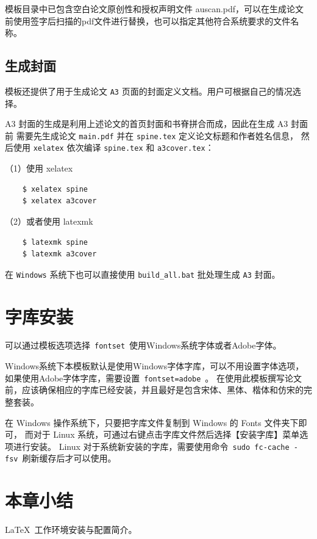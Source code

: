 模板目录中已包含空白论文原创性和授权声明文件 auscan.pdf，可以在生成论文前使用签字后扫描的pdf文件进行替换，也可以指定其他符合系统要求的文件名称。

\subsection{生成封面}
\label{sec:generate-cover}

模板还提供了用于生成论文 \texttt{A3} 页面的封面定义文档。用户可根据自己的情况选择。

A3 封面的生成是利用上述论文的首页封面和书脊拼合而成，因此在生成 A3 封面前
需要先生成论文 \texttt{main.pdf} 并在 \texttt{spine.tex} 定义论文标题和作者姓名信息，
然后使用 \texttt{xelatex} 依次编译 \texttt{spine.tex} 和 \texttt{a3cover.tex}：

（1）使用 xelatex

\begin{lstlisting}
    $ xelatex spine
    $ xelatex a3cover
\end{lstlisting}

（2）或者使用 latexmk

\begin{lstlisting}
    $ latexmk spine
    $ latexmk a3cover
\end{lstlisting}

在 \texttt{Windows} 系统下也可以直接使用 \texttt{build\_all.bat} 批处理生成 \texttt{A3} 封面。

\section{字库安装}

可以通过模板选项选择~\texttt{fontset}~使用Windows系统字体或者Adobe字体。

Windows系统下本模板默认是使用Windows字体字库，可以不用设置字体选项，如果使用Adobe字体字库，需要设置~\texttt{fontset=adobe}~。
在使用此模板撰写论文前，应该确保相应的字库已经安装，并且最好是包含宋体、黑体、楷体和仿宋的完整套装。

在 Windows 操作系统下，只要把字库文件复制到 Windows 的 Fonts 文件夹下即可，
而对于 Linux 系统，可通过右键点击字库文件然后选择【安装字库】菜单选项进行安装。
Linux 对于系统新安装的字库，需要使用命令~\texttt{sudo fc-cache -fsv}~刷新缓存后才可以使用。

\section*{本章小结}
\LaTeX{}~工作环境安装与配置简介。
